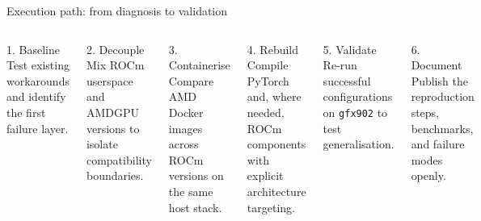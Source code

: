 \documentclass[aspectratio=169,11pt]{beamer}
\newcommand{\mono}[1]{\texttt{#1}}
\begin{document}
\begin{frame}[shrink=8]{Execution path: from diagnosis to validation}
    \begin{columns}[T,onlytextwidth]
        \begin{block}{1. Baseline}
            Test existing workarounds and identify the first failure layer.
        \end{block}

        \begin{block}{2. Decouple}
            Mix ROCm userspace and AMDGPU versions to isolate compatibility boundaries.
        \end{block}

        \begin{block}{3. Containerise}
            Compare AMD Docker images across ROCm versions on the same host stack.
        \end{block}

        \begin{block}{4. Rebuild}
            Compile PyTorch and, where needed, ROCm components with explicit architecture targeting.
        \end{block}

        \begin{block}{5. Validate}
            Re-run successful configurations on \mono{gfx902} to test generalisation.
        \end{block}

        \begin{block}{6. Document}
            Publish the reproduction steps, benchmarks, and failure modes openly.
        \end{block}
    \end{columns}
\end{frame}
\end{document}
